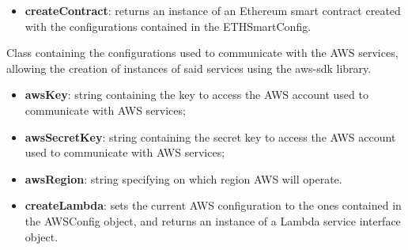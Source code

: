 	\begin{itemize}
		\item \textbf{createContract}: returns an instance of an Ethereum smart contract created with the configurations contained in the ETHSmartConfig.
	\end{itemize}
	Class containing the configurations used to communicate with the AWS services, allowing the creation of instances of said services using the aws-sdk library.
	\begin{itemize}
		\item \textbf{awsKey}: string containing the key to access the AWS account used to communicate with AWS services;
		\item \textbf{awsSecretKey}: string containing the secret key to access the AWS account used to communicate with AWS services;
		\item \textbf{awsRegion}: string specifying on which region AWS will operate.
	\end{itemize}
	\begin{itemize}
		\item \textbf{createLambda}: sets the current AWS configuration to the ones contained in the AWSConfig object, and returns an instance of a Lambda service interface object.
	\end{itemize}
